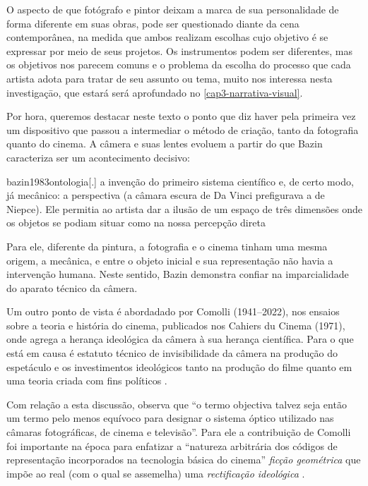 O aspecto de que fotógrafo e pintor deixam a marca de sua personalidade
de forma diferente em suas obras, pode ser questionado diante da cena
contemporânea, na medida que ambos realizam escolhas cujo objetivo é se
expressar por meio de seus projetos. Os instrumentos podem ser
diferentes, mas os objetivos nos parecem comuns e o problema da escolha
do processo que cada artista adota para tratar de seu assunto ou tema,
muito nos interessa nesta investigaçāo, que estará será aprofundado no
\cref{cap3-narrativa-visual}.

Por hora, queremos destacar neste texto o ponto que diz haver pela
primeira vez um dispositivo que passou a intermediar o método de
criação, tanto da fotografia quanto do cinema. A câmera e suas lentes
evoluem a partir do que Bazin caracteriza ser um acontecimento
decisivo:

\begin{displaycquote}[125]{bazin1983ontologia}[.]
	\textelp{} a invenção do primeiro sistema científico e, de certo modo, já
	mecânico: a perspectiva (a câmara escura de Da Vinci prefigurava a de
	Niepce). Ele permitia ao artista dar a ilusão de um espaço de três
	dimensões onde os objetos se podiam situar como na nossa percepção
	direta
\end{displaycquote}

Para ele, diferente da pintura, a fotografia e o cinema tinham uma
mesma origem, a mecânica, e entre o objeto inicial e sua representação
não havia a intervenção humana. Neste sentido, Bazin demonstra confiar
na imparcialidade do aparato técnico da câmera.

Um outro ponto de vista é abordadado por Comolli (1941--2022), nos
ensaios sobre a teoria e história do cinema, publicados nos Cahiers du
Cinema (1971), onde agrega a herança ideológica da câmera à sua herança
científica. Para \textcite{comolli2015cinema} o que está em causa é estatuto técnico
de invisibilidade da câmera na produção do espetáculo e os
investimentos ideológicos tanto na produção do filme quanto em uma
teoria criada com fins políticos \parencite{comolli2015cinema}.

Com relação a esta discussão, \textcite{grilo1993ordem}
observa que \enquote{o termo objectiva talvez seja então um termo pelo
	menos equívoco para designar o sistema óptico utilizado nas câmaras
	fotográficas, de cinema e televisão}. Para ele a contribuição de
Comolli foi importante na época para enfatizar a \enquote{natureza
	arbitrária dos códigos de representação incorporados na tecnologia
	básica do cinema} \textelp{} \emph{ficção geométrica} que impõe ao real
(com o qual se assemelha) uma \emph{rectificação ideológica}
\parencite[332-333]{grilo1993ordem}.

